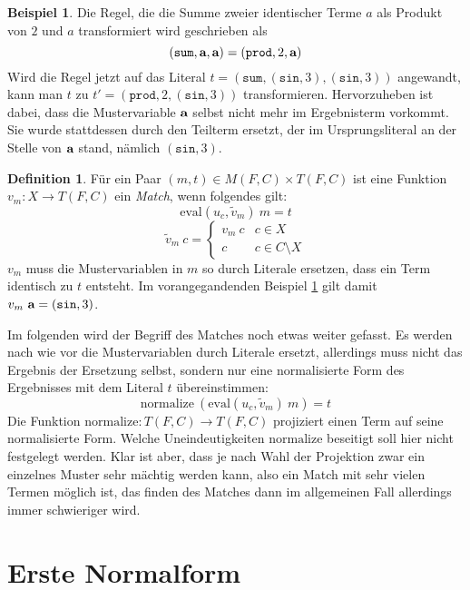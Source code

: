 \documentclass{scrartcl}
\numberwithin{figure}{section} %
\theoremstyle{definition} %
\begin{document}
\newtheorem{bMuster}[bsp]{Beispiel} 
\begin{bMuster} \label{bMuster}
Die Regel, die die Summe zweier identischer Terme $a$ als Produkt von $2$ und $a$ transformiert wird geschrieben als
$$(\texttt{sum}, \textbf a, \textbf a) = (\texttt{prod}, 2, \textbf a)$$
Wird die Regel jetzt auf das Literal 
$t = (\texttt{sum}, (\texttt{sin}, 3), (\texttt{sin}, 3))$ angewandt, kann man $t$ zu $t' = (\texttt{prod}, 2, (\texttt{sin}, 3))$ transformieren. 
Hervorzuheben ist dabei, dass die Mustervariable $\textbf a$ selbst nicht mehr im Ergebnisterm vorkommt. Sie wurde stattdessen durch den Teilterm ersetzt, der im Ursprungsliteral an der Stelle von $\textbf a$ stand, nämlich $(\texttt{sin}, 3)$.
\end{bMuster}

\newtheorem{defMatch}[bsp]{Definition}
\begin{defMatch}
Für ein Paar $(m, t) \in M(F, C) \times T(F, C)$ ist eine Funktion $v_m \colon X \rightarrow T(F, C)$ ein \emph{Match}, wenn folgendes gilt:
$$\mathrm{eval}(u_c, \tilde v_m)~ m = t$$
$$\tilde v_m~ c = \begin{cases}
	v_m~ c & c \in X\\
	c      & c \in C \setminus X
\end{cases}$$
$v_m$ muss die Mustervariablen in $m$ so durch Literale ersetzen, dass ein Term identisch zu $t$ entsteht. 
Im vorangegandenden Beispiel \ref{bMuster} gilt damit $v_m~ \textbf a = (\texttt{sin}, 3)$.

Im folgenden wird der Begriff des Matches noch etwas weiter gefasst. Es werden nach wie vor die Mustervariablen durch Literale ersetzt, allerdings muss nicht das Ergebnis der Ersetzung selbst, sondern nur eine normalisierte Form des Ergebnisses mit dem Literal $t$ übereinstimmen:
$$\mathrm{normalize}~(\mathrm{eval}(u_c, \tilde v_m)~ m) = t$$
Die Funktion $\mathrm{normalize} \colon T(F, C) \rightarrow T(F, C)$ projiziert einen Term auf seine normalisierte Form. Welche Uneindeutigkeiten $\mathrm{normalize}$ beseitigt soll hier nicht festgelegt werden. Klar ist aber, dass je nach Wahl der Projektion zwar ein einzelnes Muster sehr mächtig werden kann, also ein Match mit sehr vielen Termen möglich ist, das finden des Matches dann im allgemeinen Fall allerdings immer schwieriger wird.
\end{defMatch}






\section {Erste Normalform} \label{secErsteNormalform}
\end{document}
